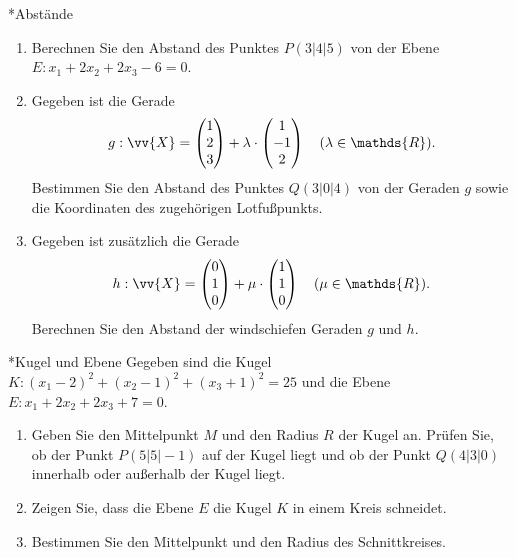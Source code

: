 
\begin{uebung}*{Abstände}
\begin{enumerate}[label=\alph*)]
  \item Berechnen Sie den Abstand des Punktes $P(3|4|5)$ von der Ebene $E: x_1+2x_2+2x_3-6=0$.
  \item Gegeben ist die Gerade \[g: \vv{X} = \begin{pmatrix} 1\\ 2\\ 3\end{pmatrix} + \lambda\cdot\begin{pmatrix} 1\\ -1\\ 2\end{pmatrix}\quad(\lambda\in\mathds{R}).\] Bestimmen Sie den Abstand des Punktes $Q(3|0|4)$ von der Geraden $g$ sowie die Koordinaten des zugehörigen Lotfußpunkts.
  \item Gegeben ist zusätzlich die Gerade \[h: \vv{X} = \begin{pmatrix} 0\\ 1\\ 0\end{pmatrix} + \mu\cdot\begin{pmatrix} 1\\ 1\\ 0\end{pmatrix}\quad(\mu\in\mathds{R}).\] Berechnen Sie den Abstand der windschiefen Geraden $g$ und $h$.
\end{enumerate}
\end{uebung}


\begin{uebung}*{Kugel und Ebene}
Gegeben sind die Kugel $K: (x_1-2)^2+(x_2-1)^2+(x_3+1)^2 = 25$ und die Ebene $E: x_1+2x_2+2x_3+7=0$.
\begin{enumerate}[label=\alph*)]
  \item Geben Sie den Mittelpunkt $M$ und den Radius $R$ der Kugel an. Prüfen Sie, ob der Punkt $P(5|5|-1)$ auf der Kugel liegt und ob der Punkt $Q(4|3|0)$ innerhalb oder außerhalb der Kugel liegt.
  \item Zeigen Sie, dass die Ebene $E$ die Kugel $K$ in einem Kreis schneidet.
  \item Bestimmen Sie den Mittelpunkt und den Radius des Schnittkreises.
\end{enumerate}
\end{uebung}

